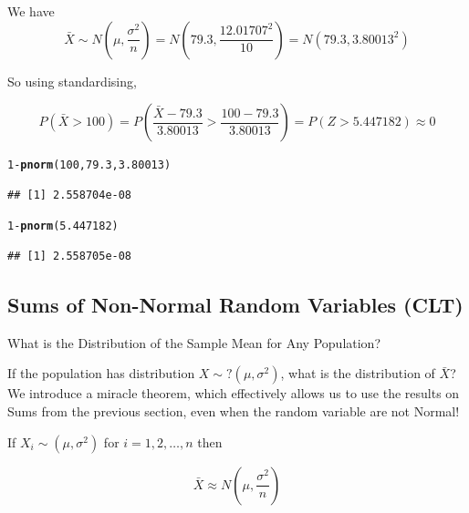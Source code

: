 \documentclass[t,xcolor=pdftex,dvipsnames,table]{beamer}
\makeatletter
\newcommand{\hlnum}[1]{\textcolor[rgb]{0.686,0.059,0.569}{#1}}%
\newcommand{\hlopt}[1]{\textcolor[rgb]{0,0,0}{#1}}%
\newcommand{\hlstd}[1]{\textcolor[rgb]{0.345,0.345,0.345}{#1}}%
\newcommand{\hlkwd}[1]{\textcolor[rgb]{0.737,0.353,0.396}{\textbf{#1}}}%
\newenvironment{kframe}{%
 \def\at@end@of@kframe{}%
 \ifinner\ifhmode%
  \def\at@end@of@kframe{\end{minipage}}%
  \begin{minipage}{\columnwidth}%
 \fi\fi%
 \def\FrameCommand##1{\hskip\@totalleftmargin \hskip-\fboxsep
 \colorbox{shadecolor}{##1}\hskip-\fboxsep
     \hskip-\linewidth \hskip-\@totalleftmargin \hskip\columnwidth}%
 \MakeFramed {\advance\hsize-\width
   \@totalleftmargin\z@ \linewidth\hsize
   \@setminipage}}%
 {\par\unskip\endMakeFramed%
 \at@end@of@kframe}
\newenvironment{knitrout}{}{} %
\makeatother
\begin{document}
\begin{frame}[fragile]\frametitle{}

We have 
\[ \bar{X} \sim N(\mu,\frac{\sigma^2}{n}) = N(79.3, \frac{12.01707^2}{10} ) = N(79.3, 3.80013^2) \]

So using standardising,

\[ P(\bar{X} > 100) = P(\frac{\bar{X}-79.3}{3.80013} > \frac{100-79.3}{3.80013}) = P(Z > 5.447182) \approx 0 \]

\begin{knitrout}
\color{fgcolor}\begin{kframe}
\begin{alltt}
\hlnum{1}\hlopt{-}\hlkwd{pnorm}\hlstd{(}\hlnum{100}\hlstd{,}\hlnum{79.3}\hlstd{,}\hlnum{3.80013}\hlstd{)}
\end{alltt}
\begin{verbatim}
## [1] 2.558704e-08
\end{verbatim}
\begin{alltt}
\hlnum{1}\hlopt{-}\hlkwd{pnorm}\hlstd{(}\hlnum{5.447182}\hlstd{)}
\end{alltt}
\begin{verbatim}
## [1] 2.558705e-08
\end{verbatim}
\end{kframe}
\end{knitrout}
\end{frame}






\subsection[SumsNonNormal]{Sums of Non-Normal Random Variables (CLT)}
\begin{frame}{What is the Distribution of the Sample Mean for Any Population?}

If the population has distribution $X \sim ?(\mu, \sigma^2)$, what is the distribution of $\bar{X}$? We introduce a miracle theorem, which effectively allows us to use the results on Sums from the previous  section, even when the random variable are not Normal!

\vspace{.5cm}
\begin{definition}

If $X_{i} \sim  (\mu, \sigma^2)$ for $i=1,2,\ldots,n$ then

\[ \bar{X} \approx N (\mu, \frac{\sigma^2}{n}) \]

\end{definition}
\end{frame}
\end{document}
